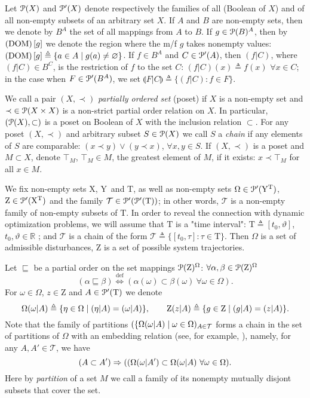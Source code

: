 \documentclass[sn-mathphys,Numbered,pdflatex]{sn-jnl}%
\theoremstyle{thmstyleone}%
\theoremstyle{thmstyletwo}%
\theoremstyle{thmstylethree}%
\newcommand{\myles}{\mathrel\prec}%
\newcommand{\myor}{\ensuremath{\lor}}%
\newcommand{\beq}{\begin{equation}}
\newcommand{\eeq}{\end{equation}}
\newcommand{\mydef}{\mathrel{\triangleq}}%
\newcommand{\icP}[1]{\EuScript{P}({#1})}%
\newcommand{\icPp}[1]{\EuScript{P^\prime}({#1})}%
\newcommand{\myll}{\ensuremath{\forall}}%
\newcommand{\res}[2]{\ensuremath{(#1|#2)}}%
\newcommand{\myimp}{\ensuremath{\mathrel{\Rightarrow}}}%
\newcommand{\myeqv}{\ensuremath{\mathrel{\Leftrightarrow}}}%
\newcommand{\myemp}{\ensuremath{\varnothing}}%
\newcommand{\myLe}{\mathrel{\sqsubseteq}}%
\newcommand{\mdef}{\ensuremath{\mathrel{\text{def}}}}%
\newcommand{\mydefeq}{\stackrel{\mdef}{\myeqv}}%
\newcommand{\RA}{\ensuremath{\mathbb R}}%
\newcommand{\naY}{\ensuremath{\mathrm{Y}}}%
\newcommand{\naX}{\ensuremath{\mathrm{X}}}%
\newcommand{\naOm}{\ensuremath{\Omega}}%
\newcommand{\naZ}{\ensuremath{\mathrm{Z}}}%
\newcommand{\naZo}[2]{\naZ\setbox0=\hbox{\text{$#1$}}\ifdim\wd0=0pt\else\res{#1}{#2}\fi}%
\newcommand{\naT}{\ensuremath{\mathrm{T}}}%
\newcommand{\naTc}{\ensuremath{\mathcal{T}}}%
\newcommand{\naOmo}[2]{\naOm\setbox0=\hbox{\text{$#1$}}\ifdim\wd0=0pt\else\res{#1}{#2}\fi}%
\newcommand{\nado}[1]{(\mathrm{DOM})\setbox0=\hbox{\text{$#1$}}\ifdim\wd0=0pt\else\left[{#1}\right]\fi}%
\newcommand{\sres}[2]{\llparenthesis#1|#2\rrparenthesis}%
\begin{document}
Let $\icP X$ and $\icPp X$ denote respectively the families of all (Boolean of $X$) and of all non-empty subsets of an arbitrary set $X$.
If $A$ and $B$ are non-empty sets, then we denote by $B^A$ the set of all mappings from $A$ to $B$.
If $g\in\icP B^A$, then by $\nado{g}$ we denote the region where the m/f $g$ takes nonempty values: $\nado{g}\mydef\{a\in A\mid g(a)\neq\myemp\}$.
If $f\in B^A$ and $C\in\icPp A$, then $\res{f}{C}$, where $\res{f}{C}\in B^C$, is the restriction of $f$ to the set $C$: $\res{f}{C}(x)\mydef f(x)$ $\myll x\in C$;
in the case when $F\in\icPp{B^A}$, we set $\sres{F}{C}\mydef\{\res{f}{C}\colon f\in F\}$.

We call a pair $(X,\myles)$ \emph{partially ordered set} (poset) if $X$ is a non-empty set and ${\myles}\in\icP{X\times X}$ is a non-strict partial order relation on $X$.
In particular, $(\icP X,\subset)$ is a poset on Boolean of $X$ with the inclusion relation ${\subset}$.
For any poset $(X,\myles)$ and arbitrary subset $S\in\icP X$ we call $S$ a \emph{chain} if any elements of $S$ are comparable: $(x\myles y)\myor(y\myles x)$, $\myll x,y\in S$.
If $(X,\myles)$ is a poset and $M\subset X$, denote $\top_M$,  $\top_M\in M$, the greatest element of $M$, if it exists: $x\myles\top_M$ for all $x\in M$.

We fix non-empty sets \naX, \naY\ and \naT, as well as non-empty sets $\naOm\in\icPp{\naY^\naT}$, $\naZ\in\icPp{\naX^\naT}$ and the family $\naTc\in\icPp{\icPp\naT}$;
in other words, $\naTc$ is a non-empty family of non-empty subsets of $\naT$.
In order to reveal the connection with dynamic optimization problems, we will assume that $\naT$ is  a "time interval": $\naT\mydef[t_0,\vartheta]$, $t_0,\vartheta\in\RA$ ; and $\naTc$ is a chain of the form $\naTc\mydef\{[t_0,\tau]:\tau\in\naT\}$.
Then $\naOm$ is a set of admissible disturbances, $\naZ$ is a set of possible system trajectories.

Let  $\myLe$ be a partial order on the set mappings $\icP\naZ^\naOm$: $\forall\alpha,\beta\in\icP\naZ^\naOm$
\beq\label{def-Le}
(\alpha\myLe\beta)\mydefeq(\alpha(\omega)\subset\beta(\omega)\ \myll\omega\in\naOm).
\eeq
For $\omega\in\naOm$, $z\in\naZ$ and $A\in\icPp\naT$ we denote
$$%
\naOmo\omega A\mydef\{\eta\in\naOm\mid \res{\eta}{A}=\res{\omega}{A}\},\label{Omo-def}\qquad
\naZo zA\mydef\{g\in\naZ\mid \res{g}{A}=\res{z}{A}\}.\label{Zo-def}
$$%
Note that the family of partitions $(\{\naOmo\omega A\mid \omega\in\naOm)_{A\in\naTc}$ forms a chain in the set of partitions of $\naOm$ with an embedding relation (see, for example, \cite[Sec.\,3.1]{Engelking1986e}), namely, for any $A,A'\in\naTc$, we have
\beq\label{Omo-isot}
(A\subset A')\myimp((\naOmo\omega{A'}\subset\naOmo\omega A\ \myll\omega\in\naOm).
\eeq
Here by \emph{partition} of a set $M$ we call a family of its nonempty mutually disjont subsets that cover the set.
\end{document}
